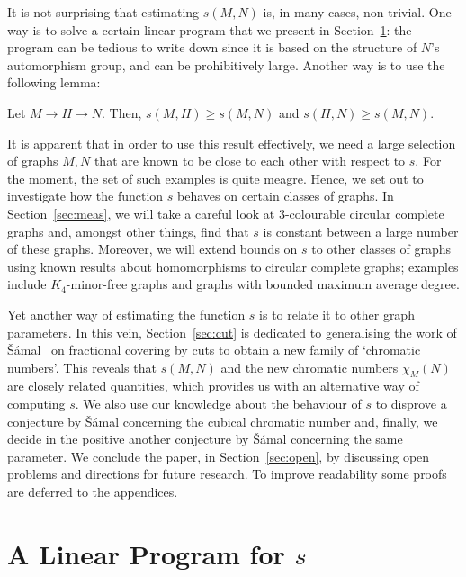 \documentclass[11pt,a4paper]{article}
\begin{document}
It is not surprising that estimating $s(M,N)$ 
is, in many cases,
non-trivial. One way is to solve a certain linear program that
we present in Section~\ref{sec:linprog}: the program
can be tedious to write down since it is based on the structure
of $N$'s automorphism group, and can be prohibitively large.
Another way is to use the following lemma:

\begin{lemma}
\label{lem:sandwich}
Let $M \rightarrow H \rightarrow N$. Then, $s(M,H) \geq s(M,N)$ and
$s(H,N) \geq s(M,N)$.
\end{lemma}

It is apparent that in order to use this result effectively, we need a large
selection of graphs $M,N$ that are known to be close to each other with respect
to $s$. For the moment, the set of such examples is quite meagre.
Hence, we set out to investigate how the function $s$ behaves on
certain classes of graphs. In Section~\ref{sec:meas}, we will take a careful
look at 3-colourable circular complete graphs and, amongst other things,
find that $s$ is constant between a large number of these graphs.
Moreover, we will extend bounds on $s$ to other classes of graphs using
known results about homomorphisms to circular complete graphs; 
examples include $K_4$-minor-free graphs and graphs with bounded
maximum average degree. 

Yet another way of estimating the function $s$ is to relate it
to other graph parameters. In this vein, Section~\ref{sec:cut} is dedicated
to generalising the work of \v{S}\'{a}mal~\cite{samal:05,samal:06}
on fractional covering by cuts to obtain a new family of `chromatic
numbers'. This reveals that $s(M,N)$ and the new chromatic numbers
$\chi_M(N)$ are closely related quantities, which provides us with an
alternative way of computing $s$.
We also use our knowledge about the behaviour of $s$ to
disprove a conjecture by \v{S}\'{a}mal concerning the cubical chromatic
number and, finally, we decide in the positive another conjecture by
\v{S}\'{a}mal concerning the same parameter.
We conclude the paper, in Section~\ref{sec:open}, by discussing
open problems and directions for future research.
To improve readability some proofs are deferred to the appendices.





\section{A Linear Program for $s$}
\label{sec:linprog}
\end{document}
